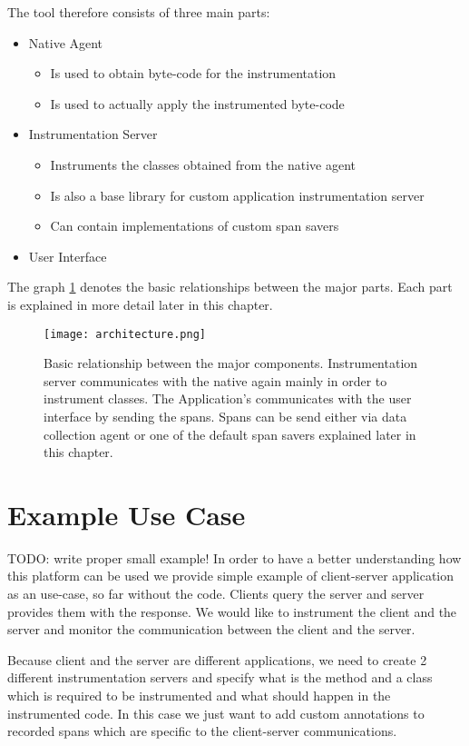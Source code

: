 The tool therefore consists of three main parts:
\begin{itemize}
	\item Native Agent
	\begin{itemize}
		\item Is used to obtain byte-code for the instrumentation
		\item Is used to actually apply the instrumented byte-code
	\end{itemize}
	\item Instrumentation Server
	\begin{itemize}
		\item Instruments the classes obtained from the native agent
		\item Is also a base library for custom application instrumentation server
		\item Can contain implementations of custom span savers
	\end{itemize}
	\item User Interface
\end{itemize}


The graph \ref{fig:architecture} denotes the basic relationships between the major parts. Each part is explained in more detail later in this chapter. \begin{figure}
	\centering
	\texttt{[image: architecture.png]}
	\caption{Basic relationship between the major components. Instrumentation server communicates with the native again mainly in order to instrument classes. The Application's communicates with the user interface by sending the spans. Spans can be send either via data collection agent or one of the default span savers explained later in this chapter.}
	\label{fig:architecture}
\end{figure}

\section{Example Use Case}
TODO: write proper small example!
In order to have a better understanding how this platform can be used we provide simple example of client-server application as an use-case, so far without the code. Clients query the server and server provides them with the response. We would like to instrument the client and the server and monitor the communication between the client and the server.

Because client and the server are different applications, we need to create 2 different instrumentation servers and specify what is the method and a class which is required to be instrumented and what should happen in the instrumented code. In this case we just want to add custom annotations to recorded spans which are specific to the client-server communications.

